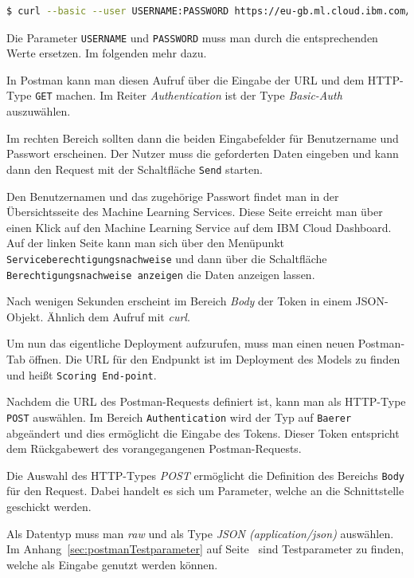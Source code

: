 \begin{lstlisting}[language=bash, caption=Abruf des Auth-Tokens, label=ls:umsetzung_apitoken]
$ curl --basic --user USERNAME:PASSWORD https://eu-gb.ml.cloud.ibm.com/v3/identity/token
\end{lstlisting}

Die Parameter \texttt{USERNAME} und \texttt{PASSWORD} muss man durch die entsprechenden Werte ersetzen. Im folgenden
mehr dazu.

In Postman kann man diesen Aufruf über die Eingabe der URL und dem HTTP-Type \texttt{GET} machen. Im Reiter
\textit{Authentication} ist der Type \textit{Basic-Auth} auszuwählen.

Im rechten Bereich sollten dann die beiden Eingabefelder für Benutzername und Passwort erscheinen. Der Nutzer muss die
geforderten Daten eingeben und kann dann den Request mit der Schaltfläche \texttt{Send} starten.

Den Benutzernamen und das zugehörige Passwort findet man in der Übersichtsseite des Machine Learning Services. Diese
Seite erreicht man über einen Klick auf den Machine Learning Service auf dem IBM Cloud Dashboard. Auf der linken Seite
kann man sich über den Menüpunkt \texttt{Serviceberechtigungsnachweise} und dann über die Schaltfläche
\texttt{Berechtigungsnachweise anzeigen} die Daten anzeigen lassen.

Nach wenigen Sekunden erscheint im Bereich \textit{Body} der Token in einem JSON-Objekt. Ähnlich dem Aufruf mit
\textit{curl}.

Um nun das eigentliche Deployment aufzurufen, muss man einen neuen Postman-Tab öffnen. Die URL für den Endpunkt ist im
Deployment des Models zu finden und heißt \texttt{Scoring End-point}.

Nachdem die URL des Postman-Requests definiert ist, kann man als HTTP-Type \texttt{POST} auswählen. Im Bereich
\texttt{Authentication} wird der Typ auf \texttt{Baerer} abgeändert und dies ermöglicht die Eingabe des Tokens. Dieser
Token entspricht dem Rückgabewert des vorangegangenen Postman-Requests.

Die Auswahl des HTTP-Types \textit{POST} ermöglicht die Definition des Bereichs \texttt{Body} für den Request. Dabei
handelt es sich um Parameter, welche an die Schnittstelle geschickt werden.

Als Datentyp muss man \textit{raw} und als Type \textit{JSON (application/json)} auswählen. Im
Anhang~\ref{sec:postmanTestparameter} auf Seite~\pageref{sec:postmanTestparameter} sind Testparameter zu finden, welche
als Eingabe genutzt werden können.

